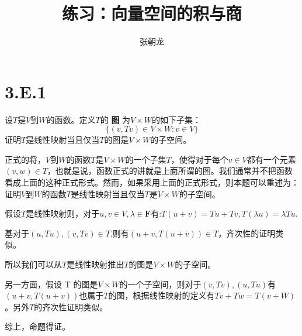 \documentclass[10pt,a4paper,UTF8]{article}
\author{张朝龙}
\date{}
\title{练习：向量空间的积与商}
\begin{document}
\maketitle
\tableofcontents
{}

\section{3.E.1}
\label{sec:org0d46596}


\begin{problem}
设\(T\)是\(V\)到\(W\)的函数。定义\(T\)的 \textbf{图} 为\(V\times W\)的如下子集：\[\{(v,Tv)\in V\times W:v\in V\}\]
证明\(T\)是线性映射当且仅当\(T\)的图是\(V\times W\)的子空间。
\end{problem}

\begin{answer}
正式的将，\(V\)到\(W\)的函数\(T\)是\(V\times W\)的一个子集\(T\)，使得对于每个\(v\in V\)都有一个元素\((v,w)\in T\)，也就是说，函数正式的讲就是上面所谓的图。我们通常并不把函数看成上面的这种正式形式。然而，如果采用上面的正式形式，则本题可以重述为：证明\(V\)到\(W\)的函数\(T\)是线性映射当且仅当\(T\)是\(V\times W\)的子空间。

假设\(T\)是线性映射则，对于\(u,v\in V, \lambda \in \mathbf{F}\)有:\(T(u+v) = Tu + Tv, T(\lambda u) = \lambda Tu\).

基对于\((u,Tu),(v,Tv)\in T\),则有\((u+v,T(u+v)) \in T\)，齐次性的证明类似。

所以我们可以从\(T\)是线性映射推出\(T\)的图是\(V\times W\)的子空间。

另一方面，假设 T 的图是\(V\times W\)的一个子空间，则对于\((v,Tv),(u,Tu)\)有\((u+v,T(u+v))\)也属于\(T\)的图，根据线性映射的定义有\(Tv+ Tw = T(v+W)\)。另外\(T\)的齐次性证明类似。

综上，命题得证。
\end{answer}
\end{document}
